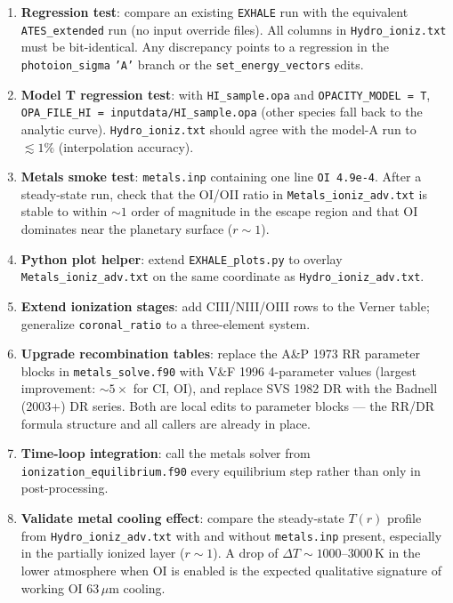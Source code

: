 \documentclass[english,a4paper]{my_memo}
\begin{document}
\begin{enumerate}
\item \textbf{Regression test}: compare an existing
\texttt{EXHALE} run with the equivalent \texttt{ATES\_extended} run
(no input override files). All columns in \texttt{Hydro\_ioniz.txt} must
be bit-identical. Any discrepancy points to a regression in the
\texttt{photoion\_sigma} \texttt{'A'} branch or the
\texttt{set\_energy\_vectors} edits.

\item \textbf{Model T regression test}: with
\texttt{HI\_sample.opa} and \texttt{OPACITY\_MODEL = T},
\texttt{OPA\_FILE\_HI = inputdata/HI\_sample.opa} (other species fall
back to the analytic curve). \texttt{Hydro\_ioniz.txt} should agree with
the model-A run to $\lesssim 1\%$ (interpolation accuracy).

\item \textbf{Metals smoke test}: \texttt{metals.inp} containing one line
\texttt{OI 4.9e-4}. After a steady-state run, check that the OI/OII ratio
in \texttt{Metals\_ioniz\_adv.txt} is stable to within $\sim 1$ order of
magnitude in the escape region and that OI dominates near the planetary
surface ($r \sim 1$).

\item \textbf{Python plot helper}: extend \texttt{EXHALE\_plots.py} to overlay
\texttt{Metals\_ioniz\_adv.txt} on the same coordinate as
\texttt{Hydro\_ioniz\_adv.txt}.

\item \textbf{Extend ionization stages}: add CIII/NIII/OIII rows to the
Verner table; generalize \texttt{coronal\_ratio} to a three-element system.

\item \textbf{Upgrade recombination tables}: replace the A\&P 1973 RR
parameter blocks in \texttt{metals\_solve.f90} with V\&F 1996
4-parameter values (largest improvement: $\sim 5\times$ for CI, OI),
and replace SVS 1982 DR with the Badnell (2003+) DR series. Both are
local edits to parameter blocks --- the RR/DR formula structure and
all callers are already in place.

\item \textbf{Time-loop integration}: call the metals solver from
\texttt{ionization\_equilibrium.f90} every equilibrium step rather than
only in post-processing.

\item \textbf{Validate metal cooling effect}: compare the steady-state
$T(r)$ profile from \texttt{Hydro\_ioniz\_adv.txt} with and without
\texttt{metals.inp} present, especially in the partially ionized layer
($r \sim 1$). A drop of $\Delta T \sim 1000$--$3000\,$K in the lower
atmosphere when OI is enabled is the expected qualitative signature
of working OI 63\,$\mu$m cooling.


\end{enumerate}
\end{document}
